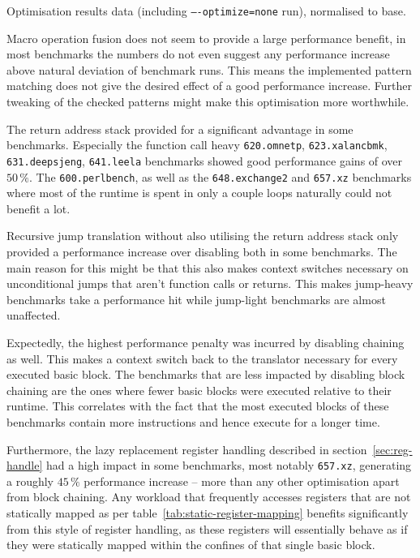 \begin{table}[h]
\centering
\pgfplotstabletypeset[columns/Benchmark/.style={string type},/pgf/number format/fixed, /pgf/number format/precision = 2,/pgf/number format/fixed zerofill=true]{\printtable}
\caption[Optimisation results]{Optimisation results data (including \texttt{----optimize=none} run), normalised to base.}
\label{tab:table-optim}
\end{table}


Macro operation fusion does not seem to provide a large performance benefit, in most benchmarks the numbers do not even suggest any performance increase above natural deviation of benchmark runs.
This means the implemented pattern matching does not give the desired effect of a good performance increase.
Further tweaking of the checked patterns might make this optimisation more worthwhile.

The return address stack provided for a significant advantage in some benchmarks.
Especially the function call heavy \texttt{620.omnetp}, \texttt{623.xalancbmk}, \texttt{631.deepsjeng}, \texttt{641.leela} benchmarks showed good performance gains of over $50\,\%$.
The \texttt{600.perlbench}, as well as the \texttt{648.exchange2} and \texttt{657.xz} benchmarks where most of the runtime is spent in only a couple loops naturally could not benefit a lot.

Recursive jump translation without also utilising the return address stack only provided a performance increase over disabling both in some benchmarks.
The main reason for this might be that this also makes context switches necessary on unconditional jumps that aren't function calls or returns.
This makes jump-heavy benchmarks take a performance hit while jump-light benchmarks are almost unaffected.

Expectedly, the highest performance penalty was incurred by disabling chaining as well.
This makes a context switch back to the translator necessary for every executed basic block.
The benchmarks that are less impacted by disabling block chaining are the ones where fewer basic blocks were executed relative to their runtime.
This correlates with the fact that the most executed blocks of these benchmarks contain more instructions and hence execute for a longer time.

Furthermore, the lazy replacement register handling described in section~\ref{sec:reg-handle} had a high impact in some benchmarks, most notably \texttt{657.xz}, generating a roughly $45\,\%$ performance increase -- more than any other optimisation apart from block chaining.
Any workload that frequently accesses registers that are not statically mapped as per table~\vref{tab:static-register-mapping} benefits significantly from this style of register handling, as these registers will essentially behave as if they were statically mapped within the confines of that single basic block.

